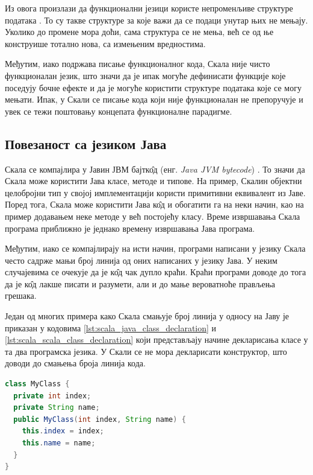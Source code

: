 \documentclass[12pt,oneside]{memoir}
\begin{document}
Из овога произлази да функционални језици користе непроменљиве структуре података \cite{scala_prog}. То су такве структуре за које важи да се подаци унутар њих не мењају. Уколико до промене мора доћи, сама структура се не мења, већ се од ње конструише тотално нова, са измењеним вредностима.

Међутим, иако подржава писање функционалног кода, Скала није чисто функционалан језик, што значи да је ипак могуће дефинисати функције које поседују бочне ефекте и да је могуће користити структуре података које се могу мењати. Ипак, у Скали се писање кода који није функционалан не препоручује и увек се тежи поштовању концепата функционалне парадигме.

\subsection{Повезаност са језиком Јава}
\label{subsec:scala_komp}

Скала се компајлира у Јавин ЈВМ бајтк\^{о}д (енг. \textit{Java JVM bytecode}) \cite{scala_prog}. То значи да Скала може користити Јава класе, методе и типове. На пример, Скалин објектни целобројни тип у својој имплементацији користи примитивни еквивалент из Јаве. Поред тога, Скала може користити Јава к\^{о}д и обогатити га на неки начин, као на пример додавањем неке методе у већ постојећу класу. Време извршавања Скала програма приближно је једнако времену извршавања Јава програма.

Међутим, иако се компајлирају на исти начин, програми написани у језику Скала често садрже мањи број линија од оних написаних у језику Јава. У неким случајевима се очекује да је к\^{о}д чак дупло краћи. Краћи програми доводе до тога да је к\^{о}д лакше писати и разумети, али и до мање вероватноће прављења грешака.

Један од многих примера како Скала смањује број линија у односу на Јаву је приказан у кодовима \ref{lst:scala_java_class_declaration} и \ref{lst:scala_scala_class_declaration} који представљају начине декларисања класе у та два програмска језика. У Скали се не мора декларисати конструктор, што доводи до смањења броја линија кода.

\begin{lstlisting}[caption={Декларација класе у језику Јава}, language=Java, label={lst:scala_java_class_declaration}]
class MyClass {  
  private int index;
  private String name;
  public MyClass(int index, String name) {
    this.index = index;
    this.name = name;
  }
}
\end{lstlisting}
\end{document}

